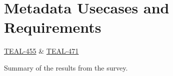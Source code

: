 \section{Metadata Usecases and Requirements}\label{sec:reqs}

\href{https://jira.skatelescope.org/browse/TEAL-455}{TEAL-455} \&  \href{https://jira.skatelescope.org/browse/TEAL-471}{TEAL-471}

Summary of the results from the survey. 
